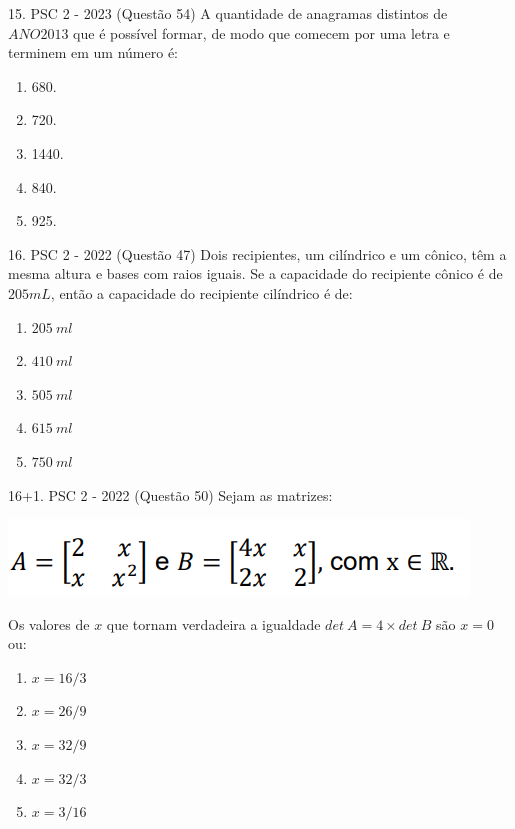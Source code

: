 \documentclass[aspectratio=169]{beamer}
\newif\ifusarcorvermelha
\newcommand{\vermelho}[1]{%
    \ifusarcorvermelha
        {\color{red}#1}%
    \else
        #1%
    \fi
}
\begin{document}
    \begin{frame}{15. PSC 2 - 2023 (Questão 54)}
        A quantidade de anagramas distintos de $ANO2013$ que é possível formar, de modo que comecem por uma letra e terminem em um número é:
       
         \begin{enumerate}[a]
            \item 680.
            \item 720.
            \item \vermelho{1440.}
            \item 840.
            \item 925.

        \end{enumerate}        
    \end{frame}

    \begin{frame}{16. PSC 2 - 2022 (Questão 47)}
        Dois recipientes, um cilíndrico e um cônico, têm a mesma altura e bases com raios iguais. Se a capacidade do recipiente cônico é de $205 mL$, então a capacidade do recipiente cilíndrico é de:

        \begin{enumerate}[a]
            \item $205\ ml$
            \item $410\ ml$
            \item $505\ ml$
            \item \vermelho{$615\ ml$} %
            \item $750\ ml$

        \end{enumerate}        
    \end{frame}

    \begin{frame}{16+1. PSC 2 - 2022 (Questão 50)}
        Sejam as matrizes:

        \begin{center}
            \includegraphics[scale=0.5]{questãoPSC2022Q50.png}
        \end{center} Os valores de $x$ que tornam verdadeira a igualdade $det\  A = 4 \times det\ B$ são $x=0$ ou:

        \begin{enumerate}[a]
            \item $x={16}/{3}$
            \item $x={26}/{9}$
            \item \vermelho{$x={32}/{9}$} %
            \item $x={32}/{3}$
            \item $x={3}/{16}$

        \end{enumerate}        
    \end{frame}
   
\end{document}
